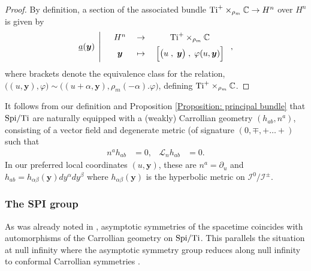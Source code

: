 \documentclass[a4paper, 10pt]{article}
\theoremstyle{remark}
\newcommand{\Ti}{\textnormal{Ti}}
\newcommand{\Spi}{\textnormal{Spi}}
\newcommand{\y}{\bm{y}}
\begin{document}
 \begin{proof}
     By definition, a section of the associated bundle $\Ti^+ \times_{\rho_m} \mathbb{C} \to H^n$ over $H^n$ is given by
 \begin{equation}
    \underline{a}(\y) \;\left|\quad  \begin{array}{ccc}
       H^n  & \to & \Ti^+ \times_{\rho_m} \mathbb{C} \\[0.4em]
       \bm{y}  &  \;\mapsto\; & \Big[  \big( u \;,\; \bm{y} \big)  \;,\; \varphi(u, \y) \Big]
    \end{array}\right.,
\end{equation}
where brackets denote the equivalence class for the relation, $\big( ( u , \bm{y} ) ,  \varphi \big) \sim \big( ( u + \alpha , \bm{y} ) ,  \rho_{m}(-\alpha). \varphi \big)$, defining $\Ti^+ \times_{\rho_m} \mathbb{C}$.
 \end{proof}

It follows from our definition and Proposition \ref{Proposition: principal bundle} that $\Spi/\Ti$ are naturally equipped with a (weakly) Carrollian geometry $(h_{ab}, n^{a})$, consisting of a vector field and degenerate metric (of signature $(0,\mp,+ \dots +)$ such that
\begin{align}
    n^a h_{ab}&=0, & \mathcal{L}_n h_{ab}&=0.
\end{align}
In our preferred local coordinates $(u,\y)$, these are $n^a= \partial_u$ and $h_{ab} = h_{\alpha \beta }(\y) dy^{\alpha}dy^{\beta}$ where $ h_{\alpha \beta }(\y)$ is the hyperbolic metric on $\mathcal{I}^{0}/\mathcal{I}^{\pm}$.

\subsubsection{The SPI group}

As was already noted in \cite{RSTA20230042}, asymptotic symmetries of the spacetime coincides with automorphisms of the Carrollian geometry on  $\Spi/\Ti$. This parallels the situation at null infinity where the asymptotic symmetry group reduces along null infinity to conformal Carrollian symmetries \cite{geroch_asymptotic_1977,duval_conformal_2014}.
\end{document}
